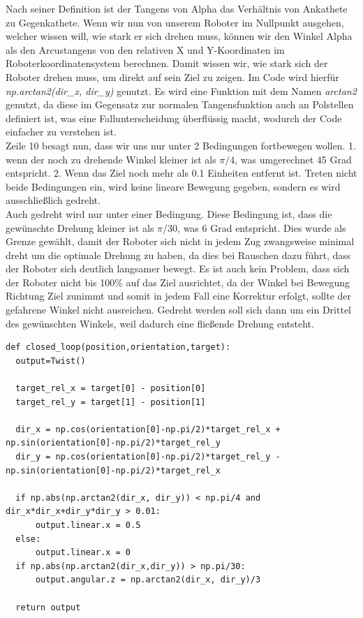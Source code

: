 \documentclass[12pt, a4paper]{report}
\begin{document}
Nach seiner Definition ist der Tangens von Alpha das Verhältnis von Ankathete zu Gegenkathete. Wenn wir nun von unserem Roboter im Nullpunkt ausgehen, welcher wissen will, wie stark er sich drehen muss, können wir den Winkel Alpha als den Arcustangens von den relativen X und Y-Koordinaten im Roboterkoordinatensystem berechnen. Damit wissen wir, wie stark sich der Roboter drehen muss, um direkt auf sein Ziel zu zeigen. Im Code wird hierfür \textit{np.arctan2(dir\_x, dir\_y)} genutzt. Es wird eine Funktion mit dem Namen \textit{arctan2} genutzt, da diese im Gegensatz zur normalen Tangensfunktion auch an Polstellen definiert ist, was eine Fallunterscheidung überflüssig macht, wodurch der Code einfacher zu verstehen ist.\\
Zeile 10 besagt nun, dass wir uns nur unter 2 Bedingungen fortbewegen wollen. 1. wenn der noch zu drehende Winkel kleiner ist als $\pi/4$, was umgerechnet 45 Grad entspricht. 2. Wenn das Ziel noch mehr als 0.1 Einheiten entfernt ist. Treten nicht beide Bedingungen ein, wird keine lineare Bewegung gegeben, sondern es wird ausschließlich gedreht.\\
Auch gedreht wird nur unter einer Bedingung. Diese Bedingung ist, dass die gewünschte Drehung kleiner ist als $\pi/30$, was 6 Grad entspricht. Dies wurde als Grenze gewählt, damit der Roboter sich nicht in jedem Zug zwangsweise minimal dreht um die optimale Drehung zu haben, da dies bei Rauschen dazu führt, dass der Roboter sich deutlich langsamer bewegt. Es ist auch kein Problem, dass sich der Roboter nicht bis 100\% auf das Ziel ausrichtet, da der Winkel bei Bewegung Richtung Ziel zunimmt und somit in jedem Fall eine Korrektur erfolgt, sollte der gefahrene Winkel nicht ausreichen. Gedreht werden soll sich dann um ein Drittel des gewünschten Winkels, weil dadurch eine fließende Drehung entsteht.

\begin{lstlisting}
def closed_loop(position,orientation,target):
  output=Twist()

  target_rel_x = target[0] - position[0]
  target_rel_y = target[1] - position[1]

  dir_x = np.cos(orientation[0]-np.pi/2)*target_rel_x + np.sin(orientation[0]-np.pi/2)*target_rel_y
  dir_y = np.cos(orientation[0]-np.pi/2)*target_rel_y - np.sin(orientation[0]-np.pi/2)*target_rel_x

  if np.abs(np.arctan2(dir_x, dir_y)) < np.pi/4 and dir_x*dir_x+dir_y*dir_y > 0.01:
      output.linear.x = 0.5
  else:
      output.linear.x = 0
  if np.abs(np.arctan2(dir_x,dir_y)) > np.pi/30:
      output.angular.z = np.arctan2(dir_x, dir_y)/3

  return output
  
\end{lstlisting}
\end{document}

